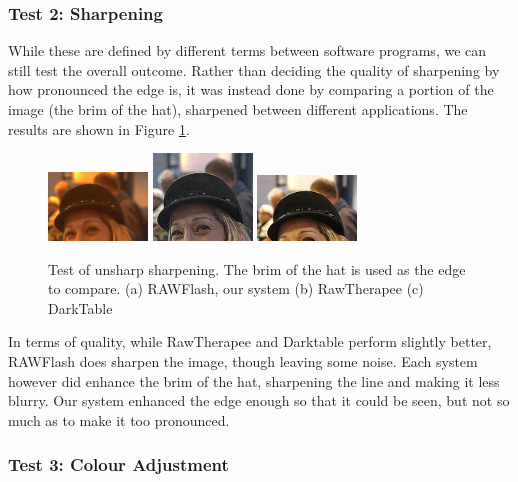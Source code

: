 \documentclass[10pt,a4paper]{article}
\begin{document}
\subsubsection{Test 2: Sharpening}
While these are defined by different terms between software programs, we can still test the overall outcome.
Rather than deciding the quality of sharpening by how pronounced the edge is, it was instead done by comparing a portion
of the image (the brim of the hat), sharpened between different applications. The results are shown in Figure \ref{unsharpcomparison}.

\begin{figure}\label{unsharpcomparison}
    \centering
    \subfigure
    {
        \includegraphics[width=100px]{rawflash_hat_sharp}
    }
    \subfigure
    {
        \includegraphics[width=100px]{rawtherapee_unsharp_max}
    }
    \subfigure
    {
        \includegraphics[width=100px]{darktable_unsharp}
    }
    \caption{
        Test of unsharp sharpening. The brim of the hat is used as the edge to compare. 
        (a) RAWFlash, our system
        (b) RawTherapee
        (c) DarkTable
    }
    \label{unsharpcomparison}
 \end{figure}

 In terms of quality, while RawTherapee and Darktable perform slightly better, RAWFlash does sharpen the image, though leaving some
 noise. Each system however did enhance the brim of the hat, sharpening the line and making it less blurry. Our system enhanced the
  edge enough so that it could be seen, but not so much as to make it too pronounced.

\subsubsection{Test 3: Colour Adjustment}
\end{document}
